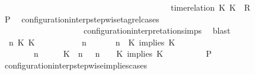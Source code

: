 \begin{isabellebody}
\ \ \ \ \ \ \ \ \ \ \ \ \ \ \ \ \ \ \ \ \ \ \ \ \ \ \ \ \ \ \ \ \ \ \ \ \ \ {\isasymturnstile}\ {\isasymPsi}\ {\isasymtriangleright}\ {\isacharparenleft}{\isacharparenleft}time{\isacharminus}relation\ {\isasymlfloor}K\ K\ {\isasymin}\ R{\isacharparenright}\ {\isacharhash}\ {\isasymPhi}{\isacharparenright}{\isacharparenright}{\isacartoucheclose}\isanewline
\ \ \ \ \ \ \isamarkupfalse%
\ {\isacharquery}P\ \isamarkupfalse%
\ configuration{\isacharunderscore}interp{\isacharunderscore}stepwise{\isacharunderscore}tagrel{\isacharunderscore}cases\isanewline
\ \ \ \ \ \ \ \ \ \ \ \ \ \ \ \ \ \ \ \ configuration{\isacharunderscore}interpretation{\isachardot}simps\ \isamarkupfalse%
\ blast\isanewline
\ \ \ \ \isamarkupfalse%
\isanewline
\ \ \ \ \ \ \isamarkupfalse%
\ {\isasymGamma}\ n\ K\ K\ {\isasymPsi}\ {\isasymPhi}\isanewline
\ \ \ \ \ \ \isamarkupfalse%
\ {\isacartoucheopen}{\isacharparenleft}{\isasymGamma}\ n\ {\isasymturnstile}\ {\isasymPsi}\ {\isasymtriangleright}\ {\isasymPhi}\ {\isacharequal}\ {\isacharparenleft}{\isasymGamma}{\isacharcomma}\ n\ {\isasymturnstile}\ {\isacharparenleft}K\ implies\ K\ {\isacharhash}\ {\isasymPsi}\ {\isasymtriangleright}\ {\isasymPhi}{\isacharparenright}{\isacartoucheclose}\isanewline
\ \ \ \ \ \ \ {\isacartoucheopen}{\isacharparenleft}{\isasymGamma}\ n\ {\isasymturnstile}\ {\isasymPsi}\ {\isasymtriangleright}\ {\isasymPhi}\ {\isacharequal}\ {\isacharparenleft}{\isacharparenleft}{\isacharparenleft}K\ {\isasymnot}{\isasymUp}\ n{\isacharparenright}\ {\isacharhash}\ {\isasymGamma}{\isacharparenright}{\isacharcomma}\ n\ {\isasymturnstile}\ {\isasymPsi}\ {\isasymtriangleright}\ {\isacharparenleft}{\isacharparenleft}K\ implies\ K\ {\isacharhash}\ {\isasymPhi}{\isacharparenright}{\isacharparenright}{\isacartoucheclose}\isanewline
\ \ \ \ \ \ \isamarkupfalse%
\ {\isacharquery}P\ \isamarkupfalse%
\ configuration{\isacharunderscore}interp{\isacharunderscore}stepwise{\isacharunderscore}implies{\isacharunderscore}cases\isanewline

\end{isabellebody}
